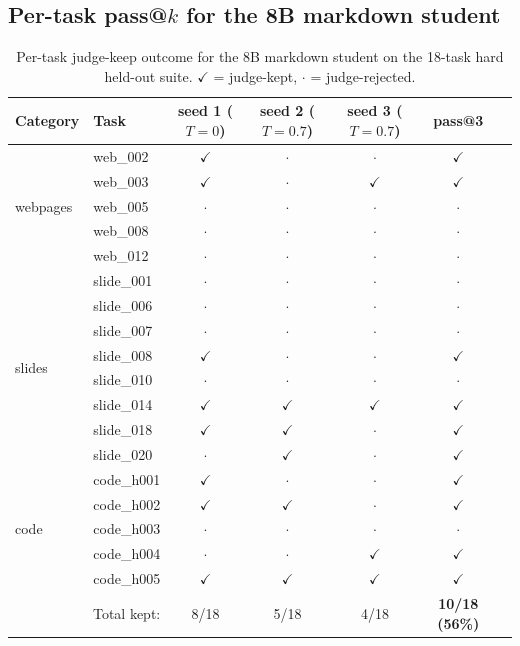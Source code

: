 \subsection{Per-task pass@$k$ for the 8B markdown student}
\begin{table}[H]
\centering
\caption{Per-task judge-keep outcome for the 8B markdown student on the 18-task hard held-out suite. $\checkmark$ = judge-kept, $\cdot$ = judge-rejected.}
\label{tab:per-task-md}
\small
\begin{tabular}{llccccc}
\toprule
Category & Task & seed 1 ($T{=}0$) & seed 2 ($T{=}0.7$) & seed 3 ($T{=}0.7$) & pass@3 \\
\midrule
\multirow{5}{*}{webpages} & web\_002 & $\checkmark$ & $\cdot$ & $\cdot$ & $\checkmark$ \\
& web\_003 & $\checkmark$ & $\cdot$ & $\checkmark$ & $\checkmark$ \\
& web\_005 & $\cdot$ & $\cdot$ & $\cdot$ & $\cdot$ \\
& web\_008 & $\cdot$ & $\cdot$ & $\cdot$ & $\cdot$ \\
& web\_012 & $\cdot$ & $\cdot$ & $\cdot$ & $\cdot$ \\
\midrule
\multirow{8}{*}{slides} & slide\_001 & $\cdot$ & $\cdot$ & $\cdot$ & $\cdot$ \\
& slide\_006 & $\cdot$ & $\cdot$ & $\cdot$ & $\cdot$ \\
& slide\_007 & $\cdot$ & $\cdot$ & $\cdot$ & $\cdot$ \\
& slide\_008 & $\checkmark$ & $\cdot$ & $\cdot$ & $\checkmark$ \\
& slide\_010 & $\cdot$ & $\cdot$ & $\cdot$ & $\cdot$ \\
& slide\_014 & $\checkmark$ & $\checkmark$ & $\checkmark$ & $\checkmark$ \\
& slide\_018 & $\checkmark$ & $\checkmark$ & $\cdot$ & $\checkmark$ \\
& slide\_020 & $\cdot$ & $\checkmark$ & $\cdot$ & $\checkmark$ \\
\midrule
\multirow{5}{*}{code} & code\_h001 & $\checkmark$ & $\cdot$ & $\cdot$ & $\checkmark$ \\
& code\_h002 & $\checkmark$ & $\checkmark$ & $\cdot$ & $\checkmark$ \\
& code\_h003 & $\cdot$ & $\cdot$ & $\cdot$ & $\cdot$ \\
& code\_h004 & $\cdot$ & $\cdot$ & $\checkmark$ & $\checkmark$ \\
& code\_h005 & $\checkmark$ & $\checkmark$ & $\checkmark$ & $\checkmark$ \\
\midrule
\multicolumn{2}{r}{Total kept:} & 8/18 & 5/18 & 4/18 & \textbf{10/18 (56\%)} \\
\bottomrule
\end{tabular}
\end{table}
